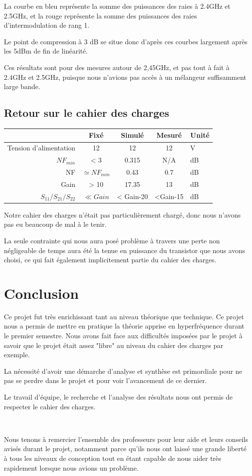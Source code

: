 \documentclass[12pt]{article}
\begin{document}
La courbe en bleu représente la somme des puissances des raies à 2.4GHz et 2.5GHz, et la rouge représente la somme des puissances des raies d’intermodulation de rang 1.

Le point de compression à 3 dB se situe donc d’après ces courbes largement après les 5dBm de fin de linéarité.

Ces résultats sont pour des mesures autour de 2,45GHz, et pas tout à fait à 2.4GHz et 2.5GHz, puisque nous n’avions pas accès à un mélangeur suffisamment large bande.


\subsection{Retour sur le cahier des charges}

\begin{center}
\begin{tabular}{|r|c|c|c|l|}
\hline 
 & Fixé & Simulé & Mesuré & Unité\\ 
\hline 
Tension d’alimentation & 12 & 12 & 12 & V \\
\hline 
$NF_{min}$ & < 3 & 0.315 & N/A & dB\\ 
\hline 
NF & $\simeq NF_{min}$ & 0.43 & 0.7 & dB\\ 
\hline 
Gain & > 10 & 17.35 & 13 & dB \\ 
\hline 
$S_{11}/S_{21}/S_{22}$ & $\ll Gain$ & < Gain-20 & <Gain-15 & dB \\
\hline
\end{tabular} 
\end{center}

Notre cahier des charges n’était pas particulièrement chargé, donc nous n’avons pas eu beaucoup de mal à le tenir.

La seule contrainte qui nous aura posé problème à travers une perte non négligeable de temps aura été la tenue en puissance du transistor que nous avons choisi, ce qui fait également implicitement partie du cahier des charges.

\section{Conclusion}

Ce projet fut très enrichissant tant au niveau théorique que technique. Ce projet nous a permis de mettre en pratique la théorie apprise en hyperfréquence durant le premier semestre. Nous avons fait face aux difficultés imposées par le projet à savoir que le projet était assez "libre" au niveau du cahier des charges par exemple.

La nécessité d'avoir une démarche d'analyse et synthèse est primordiale pour ne pas se perdre dans le projet et pour voir l'avancement de ce dernier.

Le travail d'équipe, le recherche et l'analyse des résultats nous ont permis de respecter le cahier des charges.

~

Nous tenons à remercier l'ensemble des professeurs pour leur aide et leurs conseils avisés durant le projet, notamment parce qu’ils nous ont laissé une grande liberté à tous les niveaux de conception tout en étant capable de nous aider très rapidement lorsque nous avions un problème.
\end{document}
